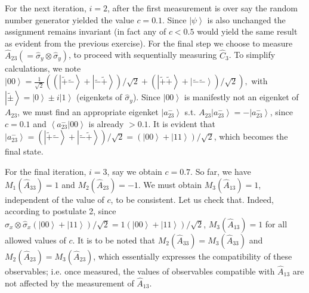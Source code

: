 \documentclass[british,aps,prl,superscriptaddress,nofootinbib,times,reprint]{revtex4-1}
\theoremstyle{plain}
\theoremstyle{plain}
\theoremstyle{definition}
\theoremstyle{remark}
\theoremstyle{remark}
\theoremstyle{remark}
\theoremstyle{plain}
\theoremstyle{plain}
\theoremstyle{plain}
\theoremstyle{definition}
\theoremstyle{definition}
\begin{document}
For the next iteration, $i=2$, 
after the first measurement is over
say the random number generator yielded the value $c=0.1$.
Since $\left|\psi\right\rangle $ is also
unchanged
the assignment remains invariant (in fact any of
$c<0.5$ would yield the same result as
evident from the previous exercise). For the
final step we choose to measure
$\hat{A}_{23}(=\hat{\sigma}_{y}\otimes\hat{\sigma}_{y})$,
to proceed with sequentially measuring
$\hat{C}_{3}$. To simplify calculations, we note
$\left|00\right\rangle
=\frac{1}{\sqrt 2} \left( (\left|\tilde{+}\tilde{-}\right\rangle
+\left|\tilde{-}\tilde{+}\right\rangle
)/\sqrt{2}+(\left|\tilde{+}\tilde{+}\right\rangle
+\left|\tilde{-}\tilde{-}\right\rangle
)/\sqrt{2}\right) , 
$
with
$\left|\tilde{\pm}\right\rangle
=\left|0\right\rangle \pm i\left|1\right\rangle $
(eigenkets of $\hat{\sigma}_{y}$). Since
$\left|00\right\rangle$ is manifestly not an
eigenket of $A_{23}$, we must find an appropriate
eigenket $\left|a^-_{23}\right\rangle $ s.t.
$A_{23}\left|a^{-}_{23}\right\rangle
=-\left|a^{-}_{23}\right\rangle $, since $c=0.1$ and
$\left\langle a_{23}^{-}|00\right\rangle $ is already
$>0.1$. It is evident that
$\left|a^{-}_{23}\right\rangle
=\left(\left|\tilde{+}\tilde{-}\right\rangle
+\left|\tilde{-}\tilde{+}\right\rangle
\right)/\sqrt{2}=\left(\left|00\right\rangle
+\left|11\right\rangle \right)/\sqrt{2}$, which
becomes the final state. 


For the final
iteration, $i=3$, say we obtain $c=0.7$. So far,
we have $M_{1}(\hat{A}_{33})=1$ and
$M_{2}(\hat{A}_{23})=-1$. We must obtain
$M_{3}(\hat{A}_{13})=1$, independent of the value
of $c$, to be consistent. Let us check that.
Indeed, according to postulate 2, since
$\hat{\sigma}_{x}\otimes\hat{\sigma}_{x}\left(\left|00\right\rangle
+\left|11\right\rangle
\right)/\sqrt{2}=1\left(\left|00\right\rangle
+\left|11\right\rangle \right)/\sqrt{2}$,
$M_{3}(\hat{A}_{13})=1$ for all allowed values of
$c$. It is to be noted that
$M_{2}(\hat{A}_{33})=M_{3}(\hat{A}_{33})$ and
$M_{2}(\hat{A}_{23})=M_{3}(\hat{A}_{23})$, which
essentially expresses the compatibility of these
observables; i.e. 
once measured, the values of observables compatible
with $\hat{A}_{13}$ are not affected by the 
measurement of $\hat{A}_{13}$.
\end{document}
